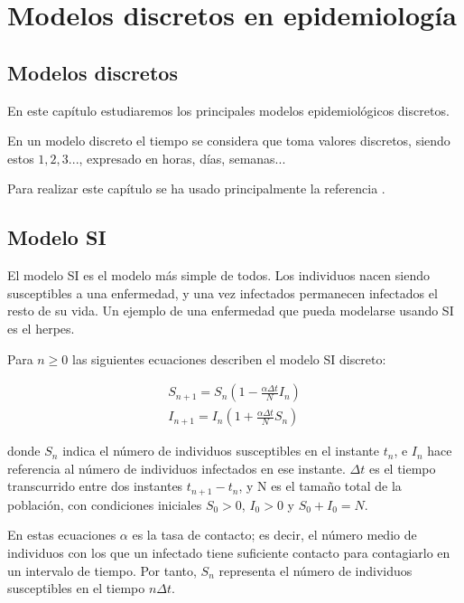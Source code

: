 \chapter{Modelos discretos en epidemiología}

\section{Modelos discretos}

En este capítulo estudiaremos los principales modelos epidemiológicos discretos.

En un modelo discreto el tiempo se considera que toma valores discretos, siendo estos $1,2,3...$, expresado en horas, días, semanas...

Para realizar este capítulo se ha usado principalmente la referencia \cite{allenDiscretetimeSISIR1994}.

\section{Modelo SI}
El modelo SI es el modelo más simple de todos. Los individuos nacen siendo susceptibles a una enfermedad, y una vez infectados permanecen infectados el resto de su vida.
Un ejemplo de una enfermedad que pueda modelarse usando SI es el herpes.

Para $n\geq 0$ las siguientes ecuaciones describen el modelo SI discreto:

\begin{equation}
\label{eqn: SI}
\begin{aligned}
S_{n+1}=S_n\left( 1-\frac{\alpha\Delta t}{N}I_n\right) \\
I_{n+1}=I_n\left( 1+\frac{\alpha\Delta t}{N}S_n\right)
\end{aligned}
\end{equation}

donde $S_n$ indica el número de individuos susceptibles en el instante $t_n$, e $I_n$ hace referencia al número de individuos infectados en ese instante. $\Delta t$ es el tiempo transcurrido entre dos instantes $t_{n+1}-t_n$, y N es el tamaño total de la población, con condiciones iniciales $S_0>0$, $I_0>0$ y $S_0+I_0=N$.

En estas ecuaciones $\alpha$ es la tasa de contacto; es decir, el número medio de individuos con los que un infectado tiene suficiente contacto para contagiarlo en un intervalo de tiempo. Por tanto, $S_n$ representa el número de individuos susceptibles en el tiempo $n\Delta t$.


